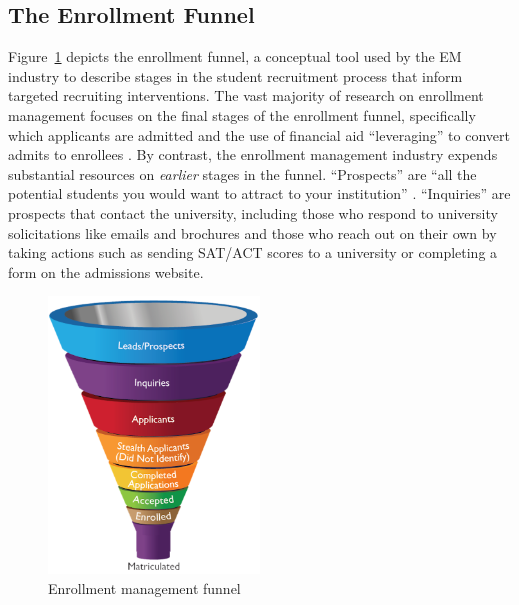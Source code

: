 \documentclass{article}
\begin{document}
\subsection*{The Enrollment Funnel}

Figure~\ref{fig:enrollment_funnel} depicts the enrollment funnel, a conceptual tool used by the EM industry to describe stages in the student recruitment process that inform targeted recruiting interventions. The vast majority of research on enrollment management focuses on the final stages of the enrollment funnel, specifically which applicants are admitted \citep{RN3536, RN3544, RN3523, RN4131} and the use of financial aid ``leveraging'' to convert admits to enrollees \citep{RN2241, RN3564, RN1948}. By contrast, the enrollment management industry expends substantial resources on \textit{earlier} stages in the funnel. ``Prospects'' are ``all the potential students you would want to attract to your institution'' \citep{RN4322}. ``Inquiries'' are prospects that contact the university, including those who respond to university solicitations like emails and brochures and those who reach out on their own by taking actions such as sending SAT/ACT scores to a university or completing a form on the admissions website.

\begin{figure}[!ht]
    \centering
    \includegraphics[width=0.5\textwidth]{assets/images/enrollment_funnel.png}
    \caption{Enrollment management funnel}
    \label{fig:enrollment_funnel}
\end{figure}
\end{document}
